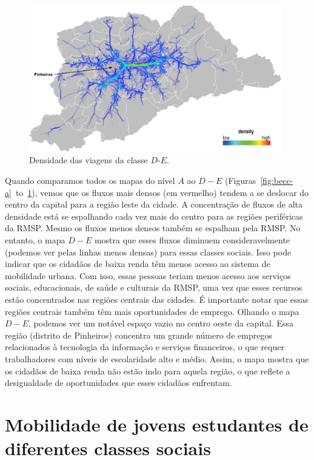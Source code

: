 \begin{figure}[!htb]
  \centering
  \captionsetup{justification=centering}
  \includegraphics[width=0.98\textwidth]{../figuras/6-class-d-e.png}
  \caption{Densidade das viagens da classe $D$-$E$. \label{fig:becc-d-e}}
\end{figure}

Quando comparamos todos os mapas do nível $A$ ao $D-E$
(Figuras~\ref{fig:becc-a}~to~\ref{fig:becc-d-e}), vemos que os fluxos mais
densos (em vermelho) tendem a se deslocar do centro da capital para a região
leste da cidade. A concentração de fluxos de alta densidade está se espalhando
cada vez mais do centro para as regiões periféricas da RMSP. Mesmo os fluxos
menos densos também se espalham pela RMSP. No entanto, o mapa $D-E$ mostra que
esses fluxos diminuem consideravelmente (podemos ver pelas linhas menos densas)
para essas classes sociais. Isso pode indicar que os cidadãos de baixa renda
têm menos acesso ao sistema de mobilidade urbana. Com isso, essas pessoas teriam
menos acesso aos serviços sociais, educacionais, de saúde e culturais da RMSP,
uma vez que esses recursos estão concentrados nas regiões centrais das cidades.
É importante notar que essas regiões centrais também têm mais oportunidades de
emprego. Olhando o mapa $D-E$, podemos ver um notável espaço vazio no centro
oeste da capital. Essa região (distrito de Pinheiros) concentra um grande número
de empregos relacionados à tecnologia da informação e serviços financeiros, o
que requer trabalhadores com níveis de escolaridade alto e médio. Assim, o mapa
mostra que os cidadãos de baixa renda não estão indo para aquela região, o que
reflete a desigualdade de oportunidades que esses cidadãos enfrentam.

\section{Mobilidade de jovens estudantes de diferentes classes sociais}
\label{sec:students}

